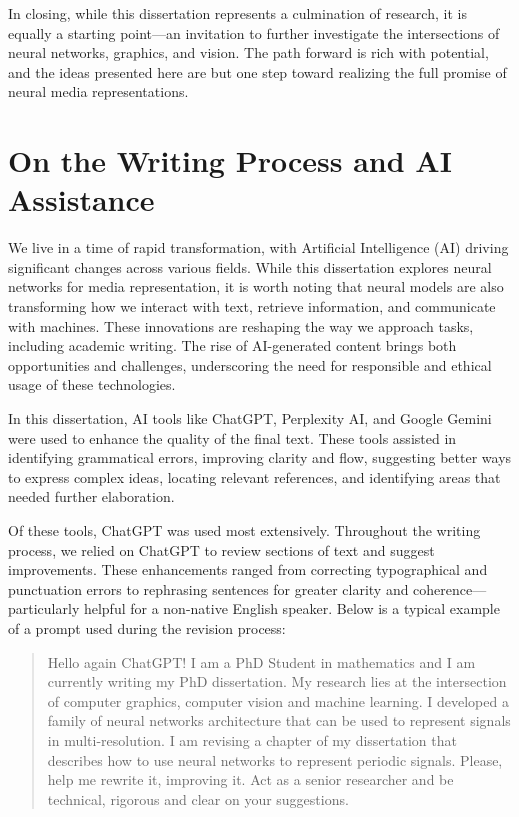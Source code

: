 In closing, while this dissertation represents a culmination of research, it is equally a starting point—an invitation to further investigate the intersections of neural networks, graphics, and vision. The path forward is rich with potential, and the ideas presented here are but one step toward realizing the full promise of neural media representations.

\setcounter{section}{0}
\renewcommand{\thesection}{7.\Alph{section}}

\section{On the Writing Process and AI Assistance}

We live in a time of rapid transformation, with Artificial Intelligence (AI) driving significant changes across various fields. While this dissertation explores neural networks for media representation, it is worth noting that neural models are also transforming how we interact with text, retrieve information, and communicate with machines. These innovations are reshaping the way we approach tasks, including academic writing. The rise of AI-generated content brings both opportunities and challenges, underscoring the need for responsible and ethical usage of these technologies.

In this dissertation, AI tools like ChatGPT, Perplexity AI, and Google Gemini were used to enhance the quality of the final text. These tools assisted in identifying grammatical errors, improving clarity and flow, suggesting better ways to express complex ideas, locating relevant references, and identifying areas that needed further elaboration.

Of these tools, ChatGPT was used most extensively. Throughout the writing process, we relied on ChatGPT to review sections of text and suggest improvements. These enhancements ranged from correcting typographical and punctuation errors to rephrasing sentences for greater clarity and coherence—particularly helpful for a non-native English speaker. Below is a typical example of a prompt used during the revision process:

\begin{quotation}
    Hello again ChatGPT! I am a PhD Student in mathematics and I am currently writing my PhD dissertation. My research lies at the intersection of computer graphics, computer vision and machine learning. I developed a family of neural networks architecture that can be used to represent signals in multi-resolution. I am revising a chapter of my dissertation that describes how to use neural networks to represent periodic signals. Please, help me rewrite it, improving it. Act as a senior researcher and be technical, rigorous and clear on your suggestions. 
\end{quotation}

